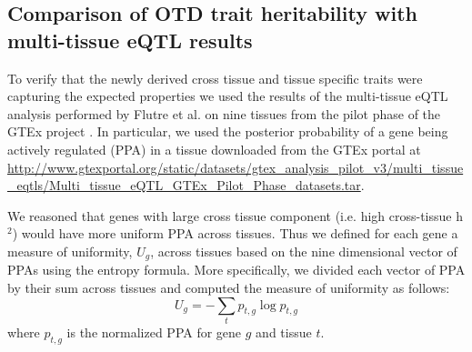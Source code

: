 \documentclass[10pt,letterpaper]{article}
\begin{document}
\subsection*{Comparison of OTD trait heritability with multi-tissue eQTL
results}\label{comparison-of-otd-pve-to-multi-tissue-eqtl-results}

To verify that the newly derived cross tissue and tissue specific traits were capturing the expected properties we used the results of the multi-tissue eQTL analysis performed by Flutre et al. \cite{Flutre_2013}
on nine tissues from the pilot phase of the GTEx project \cite{Ardlie_2015}. %
In particular, we used the posterior probability of a gene being actively regulated (PPA) in a tissue downloaded from the GTEx portal at \url{http://www.gtexportal.org/static/datasets/gtex_analysis_pilot_v3/multi_tissue_eqtls/Multi_tissue_eQTL_GTEx_Pilot_Phase_datasets.tar}.

We reasoned that genes with large cross tissue component (i.e. high cross-tissue h$^2$) would have more uniform PPA across tissues. Thus we defined for each gene a measure of uniformity, $U_g$, across tissues based on the nine dimensional vector of PPAs using the entropy formula. More specifically, we divided each vector of PPA by their sum across tissues and computed the measure of uniformity as follows:
\[ U_g = -\sum_{t}p_{t,g} \log p_{t,g} \]
%
where \(p_{t,g}\) is the normalized PPA for gene $g$ and tissue $t$.

\end{document}
